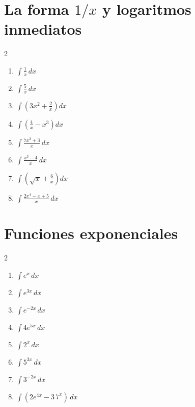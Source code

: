 \documentclass[11pt]{article}
\begin{document}
\section{La forma $1/x$ y logaritmos inmediatos}
\begin{multicols}{2}\begin{enumerate}
\item $\displaystyle \int\frac{1}{x}\,dx$
\item $\displaystyle \int\frac{5}{x}\,dx$
\item $\displaystyle \int\left(3x^2+\frac{2}{x}\right)dx$
\item $\displaystyle \int\left(\frac{4}{x}-x^3\right)dx$
\item $\displaystyle \int\frac{7x^2+3}{x}\,dx$
\item $\displaystyle \int\frac{x^3-4}{x}\,dx$
\item $\displaystyle \int\left(\sqrt{x}+\frac{6}{x}\right)dx$
\item $\displaystyle \int\frac{2x^4-x+5}{x}\,dx$
\end{enumerate}\end{multicols}

\section{Funciones exponenciales}
\begin{multicols}{2}\begin{enumerate}
\item $\displaystyle \int e^x\,dx$
\item $\displaystyle \int e^{3x}\,dx$
\item $\displaystyle \int e^{-2x}\,dx$
\item $\displaystyle \int 4e^{5x}\,dx$
\item $\displaystyle \int 2^x\,dx$
\item $\displaystyle \int 5^{3x}\,dx$
\item $\displaystyle \int 3^{-2x}\,dx$
\item $\displaystyle \int(2e^{4x}-3\,7^x)\,dx$
\end{enumerate}\end{multicols}
\end{document}
